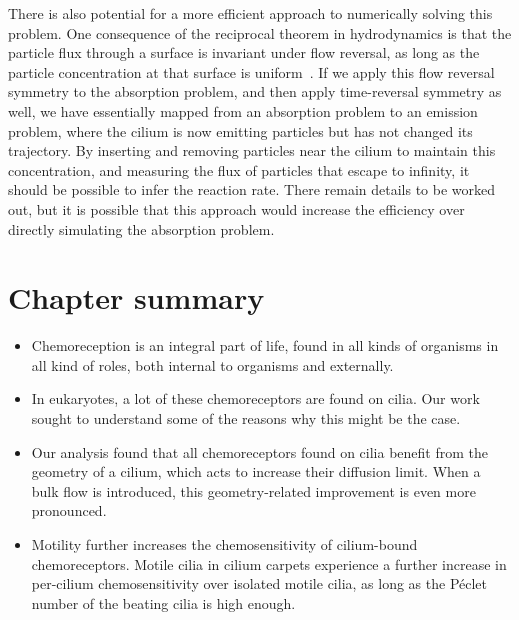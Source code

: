There is also potential for a more efficient approach to numerically solving this problem. One consequence of the reciprocal theorem in hydrodynamics is that the particle flux through a surface is invariant under flow reversal, as long as the particle concentration at that surface is uniform~. If we apply this flow reversal symmetry to the absorption problem, and then apply time-reversal symmetry as well, we have essentially mapped from an absorption problem to an emission problem, where the cilium is now emitting particles but has not changed its trajectory. By inserting and removing particles near the cilium to maintain this concentration, and measuring the flux of particles that escape to infinity, it should be possible to infer the reaction rate. There remain details to be worked out, but it is possible that this approach would increase the efficiency over directly simulating the absorption problem.







\section{Chapter summary}

\begin{itemize}
    \item Chemoreception is an integral part of life, found in all kinds of organisms in all kind of roles, both internal to organisms and externally.
    \item In eukaryotes, a lot of these chemoreceptors are found on cilia. Our work sought to understand some of the reasons why this might be the case.
    \item Our analysis found that all chemoreceptors found on cilia benefit from the geometry of a cilium, which acts to increase their diffusion limit. When a bulk flow is introduced, this geometry-related improvement is even more pronounced.
    \item Motility further increases the chemosensitivity of cilium-bound chemoreceptors. Motile cilia in cilium carpets experience a further increase in per-cilium chemosensitivity over isolated motile cilia, as long as the Péclet number of the beating cilia is high enough.
\end{itemize}
